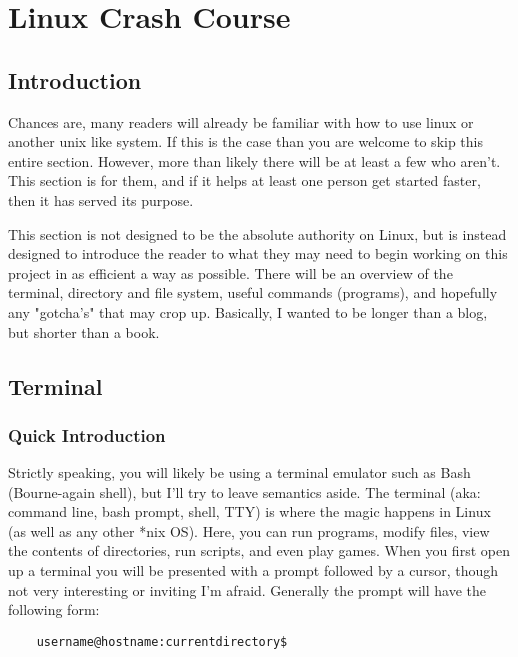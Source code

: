 \section{Linux Crash Course} \mdseries 


\subsection{Introduction} \mdseries 
Chances are, many readers will already be familiar with how to use linux or another unix like system.  If this is the case than you are welcome to skip this entire section. However, more than likely there will be at least a few who aren't.  This section is for them, and if it helps at least one person get started faster, then it has served its purpose.

This section is not designed to be the absolute authority on Linux, but is instead designed to introduce the reader to what they may need to begin working on this project in as efficient a way as possible.  There will be an overview of the terminal, directory and file system, useful commands (programs), and hopefully any "gotcha's" that may crop up.  Basically, I wanted to be longer than a blog, but shorter than a book.
	

\subsection{Terminal} \mdseries 
\subsubsection{Quick Introduction} \mdseries 
Strictly speaking, you will likely be using a terminal emulator such as Bash (Bourne-again shell), but I'll try to leave semantics aside.  The terminal (aka: command line, bash prompt, shell, TTY) is where the magic happens in Linux (as well as any other *nix OS).  Here, you can run programs, modify files, view the contents of directories, run scripts, and even play games.  When you first open up a terminal you will be presented with a prompt followed by a cursor, though not very interesting or inviting I'm afraid.  Generally the prompt will have the following form:
	
	\begin{verbatim}
	username@hostname:currentdirectory$
	\end{verbatim}
	
